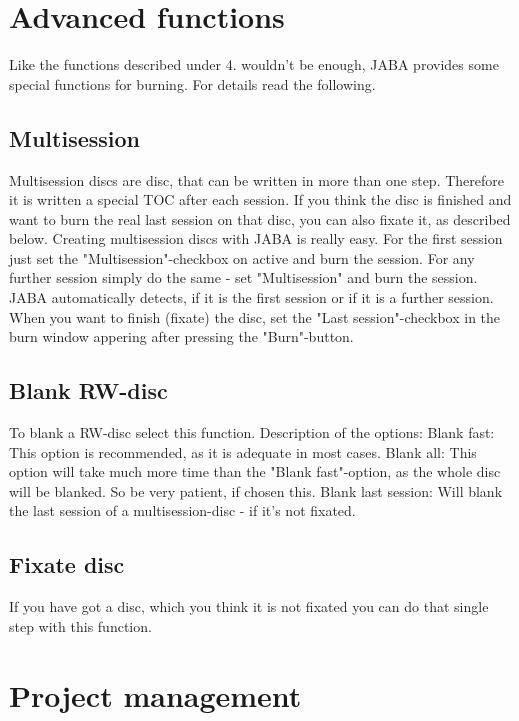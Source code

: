 \documentclass[a4paper,11pt]{article}
\begin{document}
\section{Advanced functions}

Like the functions described under 4. wouldn't be enough, JABA provides some special
functions for burning. For details read the following.

\subsection{Multisession}

Multisession discs are disc, that can be written in more than one step. Therefore it is
written a special TOC after each session. If you think the disc is finished and want to
burn the real last session on that disc, you can also fixate it, as described below.
Creating multisession discs with JABA is really easy.
For the first session just set the "Multisession"-checkbox on active and burn the session.
For any further session simply do the same - set "Multisession" and burn the session.
JABA automatically detects, if it is the first session or if it is a further session.
When you want to finish (fixate) the disc, set the "Last session"-checkbox in the burn
window appering after pressing the "Burn"-button.

\subsection{Blank RW-disc}

To blank a RW-disc select this function. Description of the options:
Blank fast:
This option is recommended, as it is adequate in most cases.
Blank all:
This option will take much more time than the "Blank fast"-option, as the whole disc will
be blanked. So be very patient, if chosen this.
Blank last session:
Will blank the last session of a multisession-disc - if it's not fixated.

\subsection{Fixate disc}

If you have got a disc, which you think it is not fixated you can do that single step with
this function.

\section{Project management}
\end{document}
